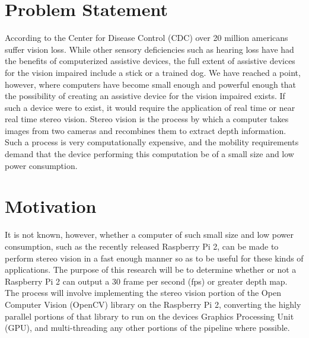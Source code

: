 \thispagestyle{plain}
\section{Problem Statement}
According to the Center for Disease Control (CDC) over 20 million americans suffer vision loss.
While other sensory deficiencies such as hearing loss have had the benefits of computerized assistive
devices, the full extent of assistive devices for the vision impaired include a stick or a trained dog.
We have reached a point, however, where computers have become small enough and powerful enough
that the possibility of creating an assistive device for the vision impaired exists.
If such a device were to exist, it would require the application of real time or near real time
stereo vision. Stereo vision is the process by which a computer takes images from two cameras and
recombines them to extract depth information. Such a process is very computationally expensive,
and the mobility requirements demand that the device performing this computation be of a small
size and low power consumption.
\section{Motivation}
It is not known, however, whether a computer of such small size and low power consumption,
such as the recently released Raspberry Pi 2, can be made to perform stereo vision in a fast enough
manner so as to be useful for these kinds of applications. The purpose of this research will be to
determine whether or not a Raspberry Pi 2 can output a 30 frame per second (fps) or greater depth
map. The process will involve implementing the stereo vision portion of the Open Computer Vision
(OpenCV) library on the Raspberry Pi 2, converting the highly parallel portions of that library to
run on the devices Graphics Processing Unit (GPU), and multi-threading any other portions of the
pipeline where possible.

